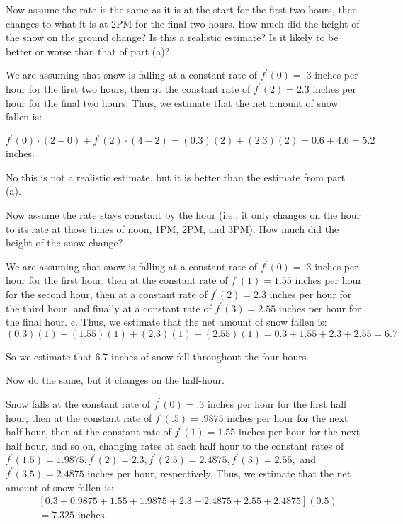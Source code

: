 \documentclass[nooutcomes]{ximera}
\renewenvironment{freeResponse}{
\ifhandout\setbox0\vbox\bgroup\else
\begin{trivlist}\item[\hskip \labelsep\bfseries Solution:\hspace{2ex}]
\fi}
{\ifhandout\egroup\else
\end{trivlist}
\fi}
\begin{document}
\begin{problem}
\begin{enumerate}
  \item  Now assume the rate is the same as it is at the start for the first two hours, then changes to what it is at 2PM for the final two hours.  How much did the height of the snow on the ground change?  Is this a realistic estimate?  Is it likely to be better or worse than that of part (a)?
    \begin{freeResponse}
      We are assuming that snow is falling at a constant rate of $f^\prime (0)=.3$ inches per hour for the first two hours, then at the constant rate of $f^\prime (2)=2.3$ inches per hour for the final two hours.  Thus, we estimate that the net amount of snow fallen is:
      
      $f^\prime (0)\cdot (2-0)+ f^\prime (2) \cdot (4-2)= (0.3)(2) + (2.3)(2) = 0.6+4.6=5.2$ inches.
      
      No this is not a realistic estimate, but it is better than the estimate from part (a).  
    \end{freeResponse}
    
  \item  Now assume the rate stays constant by the hour (i.e., it only changes on the hour to its rate at those times of noon, 1PM, 2PM, and 3PM).  How much did the height of the snow change?
    \begin{freeResponse}
      We are assuming that snow is falling at a constant rate of $f^\prime (0)=.3$ inches per hour for the first hour, then at the constant rate of $f^\prime (1)=1.55$ inches per hour for the second hour, then at a constant rate of $f^\prime (2)=2.3$ inches per hour for the third hour, and finally at a constant rate of $f^\prime (3)=2.55$ inches per hour for the final hour.  c. Thus, we estimate that the net amount of snow fallen is:
      $$ (0.3)(1) + (1.55)(1) + (2.3)(1) + (2.55)(1) = 0.3 + 1.55 + 2.3 + 2.55 = 6.7 $$
      
      So we estimate that 6.7 inches of snow fell throughout the four hours.
    \end{freeResponse}
    
  \item  Now do the same, but it changes on the half-hour.
    \begin{freeResponse}
      Snow falls at the constant rate of $f^\prime (0)=.3$ inches per hour for the first half hour, then at the constant rate of $f^\prime (.5)=.9875$ inches per hour for the next half hour, then at the constant rate of $f^\prime (1)=1.55$ inches per hour for the next half hour, and so on, changing rates at each half hour to the constant rates of $f^\prime (1.5)=1.9875, f^\prime (2)=2.3, f^\prime (2.5)=2.4875, f^\prime (3)=2.55, $ and $f^\prime (3.5)=2.4875$ inches per hour, respectively.  Thus, we estimate that the net amount of snow fallen is:
      \begin{align*}
        & [0.3 + 0.9875 + 1.55 + 1.9875 + 2.3 + 2.4875 + 2.55 + 2.4875](0.5) \\
        &= 7.325 \text{ inches}.
      \end{align*}
    \end{freeResponse}
    

\end{enumerate}
\end{problem}
\end{document}
